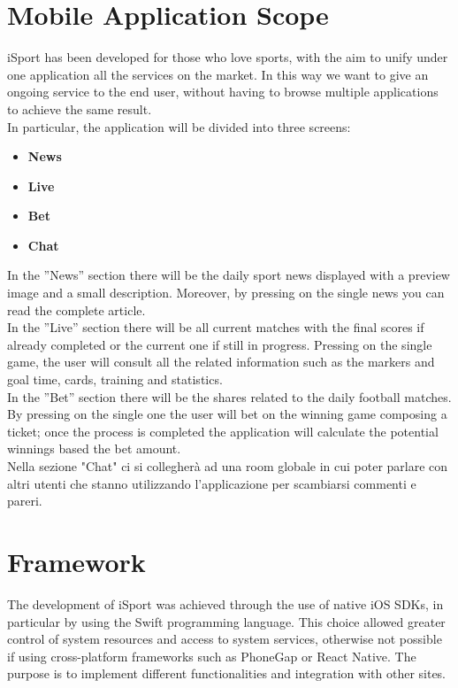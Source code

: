 \documentclass[numbers=noenddot, 12pt, a4paper, oneside]{scrbook}
\begin{document}
\section{Mobile Application Scope}
iSport has been developed for those who love sports, with the aim to unify under one application all the services on the market. In this way we want to give an ongoing service to the end user, without having to browse multiple applications to achieve the same result.\\
In particular, the application will be divided into three screens:
\begin{itemize}
	\item \textbf{News}
	\item \textbf{Live}
	\item \textbf{Bet}
	\item \textbf{Chat}
\end{itemize}
In the ”News” section there will be the daily sport news displayed with a preview image and a small description. Moreover, by pressing on the single news you can read the complete article.\\
In the ”Live” section there will be all current matches with the final scores if already completed or the current one if still in progress. Pressing on the single game, the user will consult all the related information such as the markers and goal time, cards, training and statistics.\\
In the ”Bet” section there will be the shares related to the daily football matches. By pressing on the single one the user will bet on the winning game composing a ticket; once the process is completed the application will calculate the potential winnings based the bet amount.\\
Nella sezione "Chat" ci si collegherà ad una room globale in cui poter parlare con altri utenti che stanno utilizzando l'applicazione per scambiarsi commenti e pareri.


\section{Framework}
The development of iSport was achieved through the use of native iOS SDKs, in particular by using the Swift programming language. This choice allowed greater control of system resources and access to system services, otherwise not possible if using cross-platform frameworks such as PhoneGap or React Native. The purpose is to implement different functionalities and integration with other sites.
\end{document}

